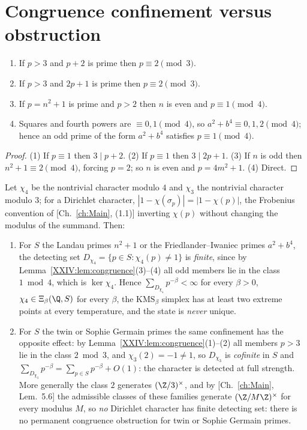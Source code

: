 \section{Congruence confinement versus obstruction}

\begin{lemma}\label{XXIV:lem:congruence}
\begin{enumerate}
\item If $p>3$ and $p+2$ is prime then $p\equiv2\pmod3$.
\item If $p>3$ and $2p+1$ is prime then $p\equiv2\pmod3$.
\item If $p=n^2+1$ is prime and $p>2$ then $n$ is even and $p\equiv1\pmod4$.
\item Squares and fourth powers are $\equiv0,1\pmod4$, so $a^2+b^4\equiv0,1,2\pmod4$; hence
an odd prime of the form $a^2+b^4$ satisfies $p\equiv1\pmod4$.
\end{enumerate}
\end{lemma}

\begin{proof}
(1) If $p\equiv1$ then $3\mid p+2$. (2) If $p\equiv1$ then $3\mid2p+1$. (3) If $n$ is odd then
$n^2+1\equiv2\pmod4$, forcing $p=2$; so $n$ is even and $p=4m^2+1$. (4) Direct.
\end{proof}

\begin{theorem}\label{XXIV:thm:permanent}
Let $\chi_4$ be the nontrivial character modulo $4$ and $\chi_3$ the nontrivial character
modulo $3$; for a Dirichlet character, $|1-\chi(\sigma_p)|=|1-\chi(p)|$, the Frobenius
convention of [Ch.~\ref{ch:Main}, (1.1)] inverting $\chi(p)$ without changing the modulus of the
summand. Then:
\begin{enumerate}
\item For $S$ the Landau primes $n^2+1$ or the Friedlander--Iwaniec primes $a^2+b^4$, the
detecting set $D_{\chi_4}=\{p\in S:\chi_4(p)\ne1\}$ is \emph{finite}, since by
Lemma~\ref{XXIV:lem:congruence}(3)--(4) all odd members lie in the class $1\bmod4$, which is
$\ker\chi_4$. Hence $\sum_{D_{\chi_4}}p^{-\beta}<\infty$ for every $\beta>0$,
$\chi_4\in\Xi_\beta(\Q,S)$ for every $\beta$, the $\mathrm{KMS}_\beta$ simplex has at
least two extreme points at every temperature, and the state is \emph{never} unique.
\item For $S$ the twin or Sophie Germain primes the same confinement has the opposite
effect: by Lemma~\ref{XXIV:lem:congruence}(1)--(2) all members $p>3$ lie in the class $2\bmod3$,
and $\chi_3(2)=-1\ne1$, so $D_{\chi_3}$ is \emph{cofinite} in $S$ and
$\sum_{D_{\chi_3}}p^{-\beta}=\sum_{p\in S}p^{-\beta}+O(1)$: the character is detected at
full strength. More generally the class $2$ generates $(\Z/3)^\times$, and by
[Ch.~\ref{ch:Main}, Lem.~5.6] the admissible classes of these families generate
$(\Z/M\Z)^\times$ for every modulus $M$, so \emph{no} Dirichlet character has finite
detecting set: there is no permanent congruence obstruction for twin or Sophie Germain
primes.
\end{enumerate}
\end{theorem}

